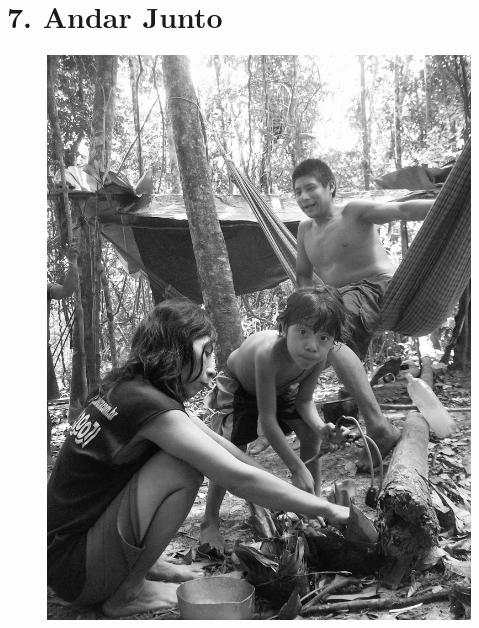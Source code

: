 
\chapter{7. Andar Junto}\label{andar-junto}

\begin{figure}[H]
\centering
  \includegraphics[width=\textwidth]{./imgs/100_4966}
\end{figure}

